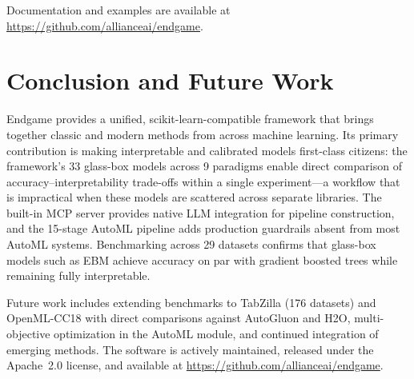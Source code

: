 \documentclass[11pt]{article}
\begin{document}
\noindent Documentation and examples are available at
\url{https://github.com/allianceai/endgame}.

\section{Conclusion and Future Work}
\label{sec:conclusion}

Endgame provides a unified, scikit-learn-compatible framework that brings
together classic and modern methods from across machine learning. Its primary
contribution is making interpretable and calibrated models first-class
citizens: the framework's 33 glass-box models across 9 paradigms enable
direct comparison of accuracy--interpretability trade-offs within a single
experiment---a workflow that is impractical when these models are scattered
across separate libraries. The built-in MCP server provides native LLM
integration for pipeline construction, and the 15-stage AutoML pipeline adds
production guardrails absent from most AutoML systems. Benchmarking across
29 datasets confirms that glass-box models such as EBM achieve accuracy on
par with gradient boosted trees while remaining fully interpretable.

Future work includes extending benchmarks to TabZilla (176 datasets) and
OpenML-CC18 with direct comparisons against AutoGluon and H2O,
multi-objective optimization in the AutoML module, and continued integration
of emerging methods. The software is actively maintained, released under the
Apache~2.0 license, and available at
\url{https://github.com/allianceai/endgame}.


\end{document}
